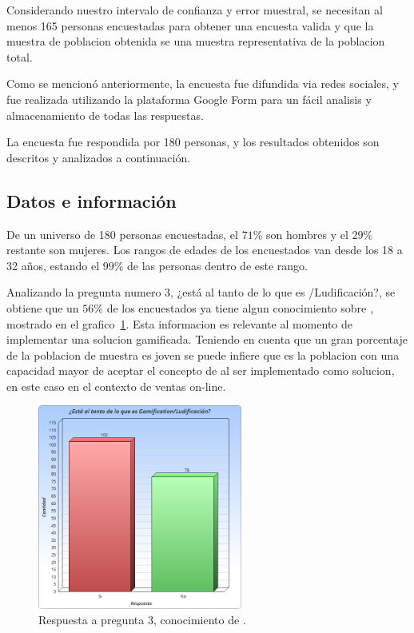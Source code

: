 Considerando nuestro intervalo de confianza y error muestral, se necesitan al menos 165
personas encuestadas para obtener una encuesta valida y que la muestra de poblacion obtenida
se una muestra representativa de la poblacion total.

Como se mencionó anteriormente, la encuesta fue difundida via redes sociales,
y fue realizada utilizando la plataforma Google Form para un fácil analisis y almacenamiento
 de todas las respuestas.

La encuesta fue respondida por 180 personas, y los resultados obtenidos son descritos y
analizados a continuación.

\subsection{Datos e información}

De un universo de 180 personas encuestadas, el $71\%$ son hombres y el $29\%$ restante son mujeres.
Los rangos de edades de los encuestados van desde los 18 a 32 años, estando el $99\%$ de las personas
dentro de este rango.

Analizando la pregunta numero 3, ¿está al tanto de lo que es {\GAM}/Ludificación?, se obtiene que
 un $56\%$ de los encuestados ya tiene algun conocimiento sobre {\GAM}, mostrado en el grafico~\ref{fig:chart5.1}.
Esta informacion es relevante al momento de implementar una solucion gamificada. 
Teniendo en cuenta que un gran porcentaje de la poblacion de muestra es joven se puede infiere 
que es la poblacion con una capacidad mayor de aceptar el concepto de {\GAM} al ser implementado 
como solucion, en este caso en el contexto de ventas on-line.

\begin{figure}[!htb]
  \centering
  \includegraphics[width=0.6\textwidth]{images/Graficos/graf_5_1.png}
  \caption[chart5.1]{Respuesta a pregunta $3$, conocimiento de {\GAM}.}
  \label{fig:chart5.1}
\end{figure}

